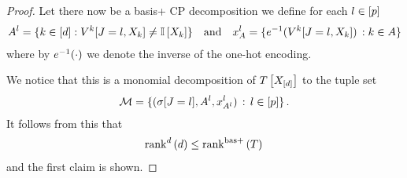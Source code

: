 \begin{proof}
	Let there now be a basis+ CP decomposition we define for each $l\in[p]$ 
	\begin{align*}
		A^{l} = \{k\in[d] : V^{k}[J=l, X_{k}] \neq \mathbb{I}\left[X_{k}\right] \}
		 \quad \text{and} \quad 
		 x_{A}^{l} = \{e^{-1}(V^{k}[J=l, X_{k}] ) \, : k\in A\}
	\end{align*}
	where by $e^{-1}(\cdot)$ we denote the inverse of the one-hot encoding.
	
	We notice that this is a monomial decomposition of $T\left[X_{[d]}\right]$ to the tuple set
	\begin{align*}
		\mathcal{M} = \{(\sigma[J=l], A^{l}, x_{A^{l}}^{l} ) \, : \, l\in[p] \} \, . 
	\end{align*}
	It follows from this that
	\begin{align*}
		\mathrm{rank}^{d}\left(d\right) \leq \mathrm{rank}^{\mathrm{bas+}}\left(T\right) \, 
	\end{align*}
	and the first claim is shown.
	

\end{proof}

